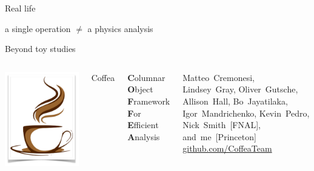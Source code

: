 \documentclass[aspectratio=169]{beamer}
\begin{document}
\begin{frame}{Real life}
\vspace{0.5 cm}
\LARGE
\begin{center}
a single operation $\ne$ a physics analysis
\end{center}
\end{frame}

\begin{frame}{Beyond toy studies}
\vspace{0.5 cm}
\begin{columns}
\includegraphics[width=\linewidth]{coffea-logo.png}

\hspace{-0.2 cm}\Huge Coffea

\vspace{0.25 cm}
\large {\bf C}olumnar {\bf O}bject {\bf F}ramework {\bf F}or {\bf E}fficient {\bf A}nalysis

\vspace{0.25 cm}
\normalsize Matteo~Cremonesi, Lindsey~Gray, Oliver~Gutsche, Allison~Hall, Bo~Jayatilaka, Igor~Mandrichenko, Kevin~Pedro, Nick~Smith~[FNAL], and~me~[Princeton] \hfill \textcolor{blue}{\url{github.com/CoffeaTeam}}
\end{columns}


\end{frame}
\end{document}

